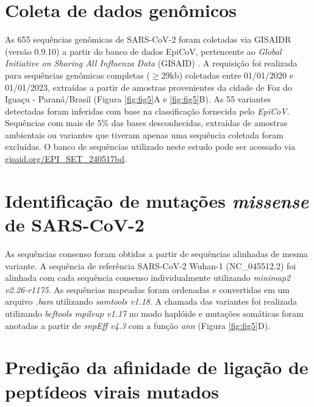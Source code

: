 \begin{justify}
\section{Coleta de dados genômicos}

As 655 sequências genômicas de SARS-CoV-2 foram coletadas via GISAIDR (versão 0.9.10) \cite{Wirth:2022} a partir do banco de dados EpiCoV, pertencente ao \textit{Global Initiative on Sharing All Influenza Data} (GISAID) \cite{Khare:2021}. A requisição foi realizada para sequências genômicas completas ($\geq$29kb) coletadas entre 01/01/2020 e 01/01/2023, extraídas a partir de amostras provenientes da cidade de Foz do Iguaçu - Paraná/Brasil (Figura \ref{fig:fig5}A e \ref{fig:fig5}B). As 55 variantes detectadas foram inferidas com base na classificação fornecida pelo \textit{EpiCoV}. Sequências com mais de 5\% das bases desconhecidas, extraídas de amostras ambientais ou variantes que tiveram apenas uma sequência coletada foram excluídas. O banco de sequências utilizado neste estudo pode ser acessado via
 \href{http://gisaid.org/EPI_SET_240517bd}{gisaid.org/EPI\_SET\_240517bd}.

\section{Identificação de mutações \textit{missense} de SARS-CoV-2}

As sequências consenso foram obtidas a partir de sequências alinhadas de mesma variante. A sequência de referência SARS-CoV-2 Wuhan-1 (NC\_045512.2) foi alinhada com cada sequência consenso individualmente utilizando \textit{minimap2 v2.26-r1175}. As sequências mapeadas foram  ordenadas e convertidas em um arquivo \textit{.bam} utilizando \textit{samtools v1.18}. A chamada das variantes foi realizada utilizando \textit{bcftools mpileup v1.17} no modo haplóide e mutações somáticas foram anotadas a partir de \textit{snpEff v4.3} com a função \textit{ann} (Figura \ref{fig:fig5}D).

\section{Predição da afinidade de ligação de peptídeos virais mutados}


\end{justify}
